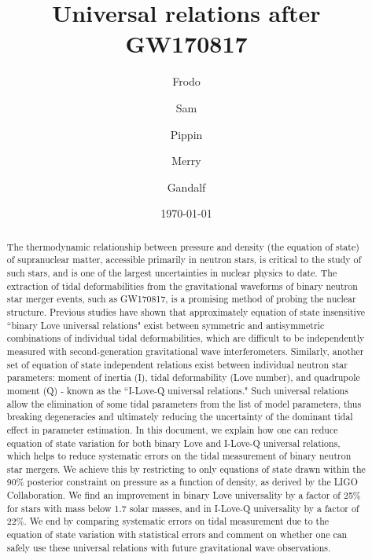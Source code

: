 \documentclass[prd,twocolumn,nofootinbib,superscriptaddress,amsmath,amssymb]{revtex4-1}
\begin{document}
\title{Universal relations after GW170817}

\author{Frodo}
\affiliation{}

\author{Sam}
\affiliation{}

\author{Pippin}
\affiliation{}

\author{Merry}
\affiliation{}

\author{Gandalf}
\affiliation{}


\date{\today}

\begin{abstract}
The thermodynamic relationship between pressure and density (the equation of state) of supranuclear matter, accessible primarily in neutron stars, is critical to the study of such stars, and is one of the largest uncertainties in nuclear physics to date. 
The extraction of tidal deformabilities from the gravitational waveforms of binary neutron star merger events, such as GW170817, is a promising method of probing the nuclear structure.
Previous studies have shown that approximately equation of state insensitive ``binary Love universal relations" exist between symmetric and antisymmetric combinations of individual tidal deformabilities, which are difficult to be independently measured with second-generation gravitational wave interferometers.
Similarly, another set of equation of state independent relations exist between individual neutron star parameters: moment of inertia (I), tidal deformability (Love number), and quadrupole moment (Q) - known as the ``I-Love-Q universal relations."
Such universal relations allow the elimination of some tidal parameters from the list of model parameters, thus breaking degeneracies and ultimately reducing the uncertainty of the dominant tidal effect in parameter estimation.
In this document, we explain how one can reduce equation of state variation for both binary Love and I-Love-Q universal relations, which helps to reduce systematic errors on the tidal measurement of binary neutron star mergers. 
We achieve this  by restricting to only equations of state drawn within the 90\% posterior constraint on pressure as a function of density, as derived by the LIGO Collaboration.
We find an improvement in binary Love universality by a factor of 25\% for stars with mass below 1.7 solar masses, and in I-Love-Q universality by a factor of 22\%.
We end by comparing systematic errors on tidal measurement due to the equation of state variation with statistical errors and comment on whether one can safely use these universal relations with future gravitational wave observations.
\end{abstract}
\end{document}
